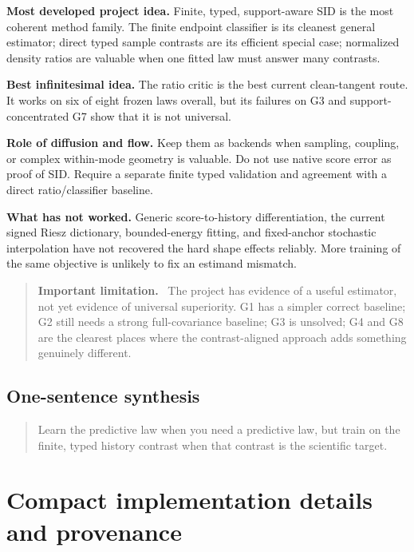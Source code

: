 \documentclass[11pt]{article}
\newenvironment{warningbox}
  {\begin{quote}\color{sidred}\textbf{Important limitation.}\ }
  {\end{quote}}
\begin{document}
\textbf{Most developed project idea.}  Finite, typed, support-aware SID is the most
coherent method family.  The finite endpoint classifier is its cleanest general
estimator; direct typed sample contrasts are its efficient special case; normalized
density ratios are valuable when one fitted law must answer many contrasts.

\textbf{Best infinitesimal idea.}  The ratio critic is the best current clean-tangent
route.  It works on six of eight frozen laws overall, but its failures on G3 and
support-concentrated G7 show that it is not universal.

\textbf{Role of diffusion and flow.}  Keep them as backends when sampling, coupling,
or complex within-mode geometry is valuable.  Do not use native score error as proof
of SID.  Require a separate finite typed validation and agreement with a direct
ratio/classifier baseline.

\textbf{What has not worked.}  Generic score-to-history differentiation, the current
signed Riesz dictionary, bounded-energy fitting, and fixed-anchor stochastic
interpolation have not recovered the hard shape effects reliably.  More training of
the same objective is unlikely to fix an estimand mismatch.

\begin{warningbox}
The project has evidence of a useful estimator, not yet evidence of universal
superiority.  G1 has a simpler correct baseline; G2 still needs a strong
full-covariance baseline; G3 is unsolved; G4 and G8 are the clearest places where the
contrast-aligned approach adds something genuinely different.
\end{warningbox}

\newpage
\begin{samepage}
\section*{One-sentence synthesis}
\begin{quote}
\large\color{sidblue}
Learn the predictive law when you need a predictive law, but train on the finite,
typed history contrast when that contrast is the scientific target.
\end{quote}
\end{samepage}

\appendix
\section{Compact implementation details and provenance}
\end{document}
